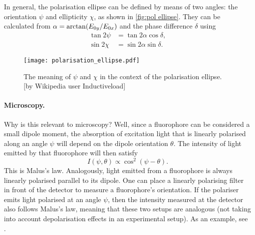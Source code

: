 In general, the polarisation ellipse can be defined by means of two angles: the orientation $ \psi $ and ellipticity $ \chi $, as shown in \autoref{fig:pol ellipse}. They can be calculated from $ \alpha = \arctan(E_{0y}/E_{0x}) $ and the phase difference $ \delta $ using
\begin{align}
	\tan 2\psi &= \tan 2\alpha \cos \delta,\\
	\sin 2\chi &= \sin 2\alpha \sin \delta.
\end{align}

\begin{figure}
	\centering
	\texttt{[image: polarisation\_ellipse.pdf]}
	\caption{The meaning of $ \psi $ and $ \chi $ in the context of the polarisation ellipse. [by Wikipedia user Inductiveload]}
	\label{fig:pol ellipse}
\end{figure}

\paragraph{Microscopy.} Why is this relevant to microscopy? Well, since a fluorophore can be considered a small dipole moment, the absorption of excitation light that is linearly polarised along an angle $ \psi $ will depend on the dipole orientation $ \theta $. The intensity of light emitted by that fluorophore will then satisfy 
\begin{equation}
	\label{eq:malus}
	I(\psi, \theta) \propto \cos^2(\psi-\theta).
\end{equation}
This is Malus's law. Analogously, light emitted from a fluorophore is always linearly polarised parallel to its dipole. One can place a linearly polarising filter in front of the detector to measure a fluorophore's orientation. If the polariser emits light polarised at an angle $ \psi $, then the intensity measured at the detector also follows Malus's law, meaning that these two setups are analogous (not taking into account depolarisation effects in an experimental setup). As an example, see .

